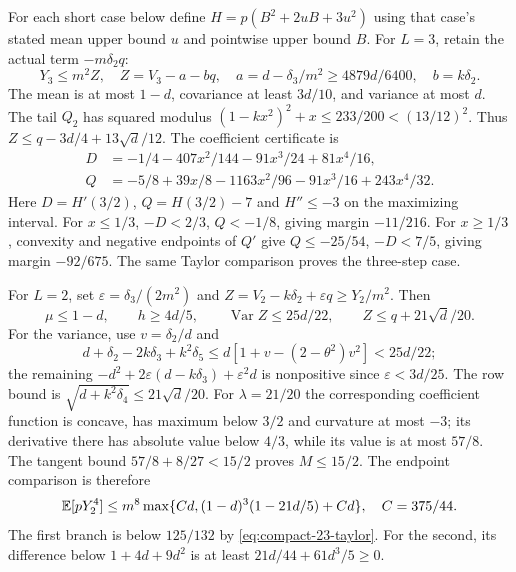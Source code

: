 For each short case below define $H=p(B^2+2uB+3u^2)$ using that case's stated mean upper bound $u$ and pointwise upper bound $B$.
For $L=3$, retain the actual term $-m\delta_{2}q$:
\[
 Y_3\le m^2Z,\quad Z=V_3-a-bq,\quad
 a=d-\delta_{3}/m^2\ge4879d/6400,\quad b=k\delta_{2}.
\]
The mean is at most $1-d$, covariance at least $3d/10$, and variance
at most $d$. The tail $Q_2$ has squared modulus
$(1-kx^2)^2+x\le233/200<(13/12)^2$.
Thus $Z\le q-3d/4+13\sqrt d/12$. The coefficient certificate is
\begin{align*}
 D&=-1/4-407x^2/144-91x^3/24+81x^4/16,\\
 Q&=-5/8+39x/8-1163x^2/96-91x^3/16+243x^4/32.
\end{align*}
Here $D=H'(3/2)$, $Q=H(3/2)-7$ and $H''\le-3$ on the maximizing
interval. For $x\le1/3$, $-D<2/3$, $Q<-1/8$, giving margin $-11/216$.
For $x\ge1/3$, convexity and negative endpoints of $Q'$ give
$Q\le-25/54$, $-D<7/5$, giving margin $-92/675$.
The same Taylor comparison proves the three-step case.

For $L=2$, set $\varepsilon=\delta_{3}/(2m^2)$ and
$Z=V_2-k\delta_{2}+\varepsilon q\ge Y_2/m^2$.
Then
\[
 \mu\le1-d,\qquad h\ge4d/5,\qquad
 \operatorname{Var}Z\le25d/22,\qquad Z\le q+21\sqrt d/20.
\]
For the variance, use $v=\delta_{2}/d$ and
\[
 d+\delta_{2}-2k\delta_{3}+k^2\delta_{5}\le d[1+v-(2-\theta^2)v^2]<25d/22;
\]
the remaining $-d^2+2\varepsilon(d-k\delta_{3})+\varepsilon^2d$ is
nonpositive since $\varepsilon<3d/25$.
The row bound is $\sqrt{d+k^2\delta_{4}}\le21\sqrt d/20$.
For $\lambda=21/20$ the corresponding coefficient function is concave,
has maximum below $3/2$ and curvature at most $-3$; its derivative there
has absolute value below $4/3$, while its value is at most $57/8$.
The tangent bound $57/8+8/27<15/2$ proves $M\le15/2$.
The endpoint comparison is therefore
\[
 \mathbb E[pY_2^4]\le m^8\max\{Cd,(1-d)^3(1-21d/5)+Cd\},\quad C=375/44.
\]
The first branch is below $125/132$ by \eqref{eq:compact-23-taylor}.
For the second, its difference below $1+4d+9d^2$ is at least
$21d/44+61d^3/5\ge0$.

